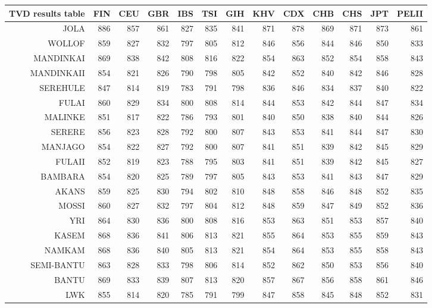 \begin{longtable}{rrrrrrrrrrrrr}
  TVD results table \toprule
 & FIN & CEU & GBR & IBS & TSI & GIH & KHV & CDX & CHB & CHS & JPT & PELII \\ 
  \midrule
JOLA & 886 & 857 & 861 & 827 & 835 & 841 & 871 & 878 & 869 & 871 & 873 & 861 \\ 
  WOLLOF & 859 & 827 & 832 & 797 & 805 & 812 & 846 & 856 & 844 & 846 & 850 & 833 \\ 
  MANDINKAI & 869 & 838 & 842 & 808 & 816 & 822 & 854 & 863 & 852 & 854 & 858 & 843 \\ 
  MANDINKAII & 854 & 821 & 826 & 790 & 798 & 805 & 842 & 852 & 840 & 842 & 846 & 828 \\ 
  SEREHULE & 847 & 814 & 819 & 783 & 791 & 798 & 836 & 846 & 834 & 837 & 840 & 822 \\ 
  FULAI & 860 & 829 & 834 & 800 & 808 & 814 & 844 & 853 & 842 & 844 & 847 & 834 \\ 
  MALINKE & 851 & 817 & 822 & 786 & 793 & 801 & 840 & 850 & 838 & 840 & 844 & 826 \\ 
  SERERE & 856 & 823 & 828 & 792 & 800 & 807 & 843 & 853 & 841 & 844 & 847 & 830 \\ 
  MANJAGO & 854 & 822 & 827 & 792 & 800 & 807 & 841 & 851 & 839 & 842 & 845 & 829 \\ 
  FULAII & 852 & 819 & 823 & 788 & 795 & 803 & 841 & 851 & 839 & 842 & 845 & 827 \\ 
  BAMBARA & 854 & 820 & 825 & 789 & 797 & 805 & 843 & 853 & 841 & 843 & 847 & 829 \\ 
   \hline 
AKANS & 859 & 825 & 830 & 794 & 802 & 810 & 848 & 858 & 846 & 848 & 852 & 835 \\ 
  MOSSI & 860 & 827 & 832 & 797 & 804 & 812 & 848 & 859 & 847 & 849 & 852 & 836 \\ 
  YRI & 864 & 830 & 836 & 800 & 808 & 816 & 853 & 863 & 851 & 853 & 857 & 840 \\ 
  KASEM & 868 & 836 & 841 & 806 & 813 & 821 & 855 & 864 & 853 & 855 & 859 & 843 \\ 
  NAMKAM & 868 & 836 & 840 & 805 & 813 & 821 & 854 & 864 & 853 & 855 & 858 & 843 \\ 
  SEMI-BANTU & 863 & 828 & 833 & 798 & 806 & 814 & 852 & 862 & 850 & 853 & 856 & 840 \\ 
  BANTU & 869 & 833 & 839 & 807 & 813 & 820 & 857 & 867 & 856 & 858 & 861 & 846 \\ 
   \hline 
LWK & 855 & 814 & 820 & 785 & 791 & 799 & 847 & 858 & 845 & 848 & 852 & 831 \\ 

\end{longtable}
